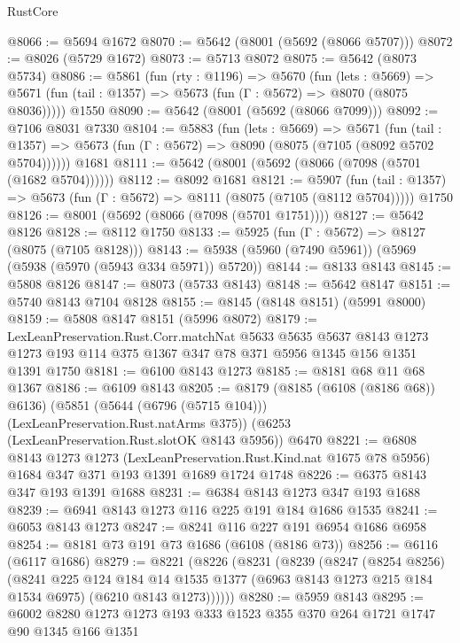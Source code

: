 \begin{lexlean}{RustCore}
\begin{coremodule}
@8066 := @5694 @1672
@8070 := @5642 (@8001 (@5692 (@8066 @5707)))
@8072 := @8026 (@5729 @1672)
@8073 := @5713 @8072
@8075 := @5642 (@8073 @5734)
@8086 := @5861
    (fun (rty : @1196) =>
    @5670
      (fun (lets : @5669) =>
      @5671 (fun (tail : @1357) => @5673 (fun (Γ : @5672) => @8070 (@8075 @8036)))))
    @1550
@8090 := @5642 (@8001 (@5692 (@8066 @7099)))
@8092 := @7106 @8031 @7330
@8104 := @5883
    (fun (lets : @5669) =>
    @5671
      (fun (tail : @1357) => @5673 (fun (Γ : @5672) => @8090 (@8075 (@7105 (@8092 @5702 @5704))))))
    @1681
@8111 := @5642 (@8001 (@5692 (@8066 (@7098 (@5701 (@1682 @5704))))))
@8112 := @8092 @1681
@8121 := @5907
    (fun (tail : @1357) => @5673 (fun (Γ : @5672) => @8111 (@8075 (@7105 (@8112 @5704)))))
    @1750
@8126 := @8001 (@5692 (@8066 (@7098 (@5701 @1751))))
@8127 := @5642 @8126
@8128 := @8112 @1750
@8133 := @5925 (fun (Γ : @5672) => @8127 (@8075 (@7105 @8128)))
@8143 := @5938 (@5960 (@7490 @5961)) (@5969 (@5938 (@5970 (@5943 @334 @5971)) @5720))
@8144 := @8133 @8143
@8145 := @5808 @8126
@8147 := @8073 (@5733 @8143)
@8148 := @5642 @8147
@8151 := @5740 @8143 @7104 @8128
@8155 := @8145 (@8148 @8151) (@5991 @8000)
@8159 := @5808 @8147 @8151 (@5996 @8072)
@8179 := LexLeanPreservation.Rust.Corr.matchNat
    @5633
    @5635
    @5637
    @8143
    @1273
    @1273
    @193
    @114
    @375
    @1367
    @347
    @78
    @371
    @5956
    @1345
    @156
    @1351
    @1391
    @1750
@8181 := @6100 @8143 @1273
@8185 := @8181 @68 @11 @68 @1367
@8186 := @6109 @8143
@8205 := @8179
    (@8185 (@6108 (@8186 @68)) @6136)
    (@5851 (@5644 (@6796 (@5715 @104))) (LexLeanPreservation.Rust.natArms @375))
    (@6253 (LexLeanPreservation.Rust.slotOK @8143 @5956))
    @6470
@8221 := @6808
    @8143
    @1273
    @1273
    (LexLeanPreservation.Rust.Kind.nat @1675 @78 @5956)
    @1684
    @347
    @371
    @193
    @1391
    @1689
    @1724
    @1748
@8226 := @6375 @8143 @347 @193 @1391 @1688
@8231 := @6384 @8143 @1273 @347 @193 @1688
@8239 := @6941 @8143 @1273 @116 @225 @191 @184 @1686 @1535
@8241 := @6053 @8143 @1273
@8247 := @8241 @116 @227 @191 @6954 @1686 @6958
@8254 := @8181 @73 @191 @73 @1686 (@6108 (@8186 @73))
@8256 := @6116 (@6117 @1686)
@8279 := @8221
    (@8226
      (@8231
        (@8239
          (@8247
            (@8254 @8256)
            (@8241
              @225
              @124
              @184
              @14
              @1535
              @1377
              (@6963 @8143 @1273 @215 @184 @1534 @6975)
              (@6210 @8143 @1273))))))
@8280 := @5959 @8143
@8295 := @6002 @8280 @1273 @1273 @193 @333 @1523 @355 @370 @264 @1721 @1747 @90 @1345 @166 @1351

\end{coremodule}
\end{lexlean}
